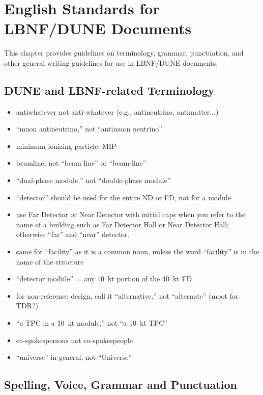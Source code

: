 \chapter{English Standards for LBNF/DUNE Documents}
\label{ch:english}

This chapter provides guidelines on terminology, grammar, punctuation, and other general writing guidelines for use in LBNF/DUNE documents. 


\section{DUNE and LBNF-related Terminology}
\label{sec:english-terminology}

\begin{itemize}
\item antiwhatever not anti-whatever (e.g., antineutrino, antimatter...)
\item ``muon antineutrino,'' not ``antimuon neutrino''
\item minimum ionizing particle: MIP
\item beamline, not ``beam line'' or ``beam-line''
\item ``dual-phase module,'' not ``double-phase module''
\item ``detector'' should be used for the entire ND or FD, not for a module
\item use Far Detector or Near Detector with initial caps when you refer to the name of a building such as Far Detector Hall or Near Detector Hall; otherwise ``far'' and ``near'' detector.
\item same for ``facility'' as it is a common noun, unless the word ``facility'' is in the name of the structure
\item ``detector module'' = any \SI{10}{kt} portion of the \SI{40}{kt} FD
\item for non-reference design, call it ``alternative,'' not ``alternate'' (moot for TDR?)
\item ``a TPC in a \SI{10}{kt} module,'' not ``a \SI{10}{kt}  TPC'' 
\item co-spokespersons not co-spokespeople
\item ``universe'' in general, not ``Universe''
\end{itemize}

\section{Spelling, Voice, Grammar and Punctuation}
\label{sec:english-spelling}

